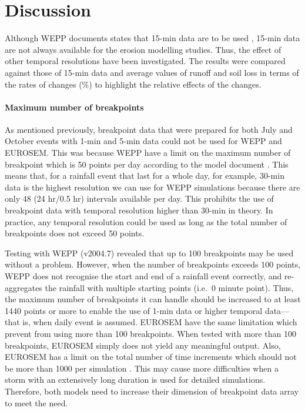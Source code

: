 \section{Discussion}
\label{sec:TemporalScalesDiscussion}

Although WEPP documents states that 15-min data are to be used
\citep{flanagan1995-weppusersummary}, 15-min data are not always available for
the erosion modelling studies. Thus, the effect of other temporal resolutions
have
been investigated. The results were compared against those of 15-min data and
average values of runoff and soil loss in terms of the rates of changes (\%) to
highlight the relative effects of the changes.

\paragraph{Maximum number of breakpoints} As mentioned previously, breakpoint
data that were prepared for both July and October events with 1-min and 5-min
data could not be used for WEPP and EUROSEM. This was because WEPP have a limit
on the maximum number of breakpoint which is 50 points per day according to the
model document \citep[see][page 10]{flanagan1995-weppusersummary}. This means
that, for a rainfall event that last for a whole day, for example, 30-min data
is the highest resolution we can use for WEPP simulations because there are only
48 (24 hr/0.5 hr) intervals available per day. This prohibits the use of
breakpoint data with temporal resolution higher than 30-min in theory. In
practice, any temporal resolution could be used as long as the total number of
breakpoints does not exceed 50 points.

Testing with WEPP (v2004.7) revealed that up to 100 breakpoints may be used
without a problem. However, when the number of breakpoints exceeds 100
points, WEPP does not recognise the start and end of a rainfall event correctly,
and re-aggregates the rainfall with multiple starting points (i.e.\ 0 minute
point). Thus, the maximum number of breakpoints it can handle should be
increased to at least 1440 points or more to enable the use of 1-min data or
higher temporal data---that is, when daily event is assumed. EUROSEM have the
same limitation which prevent from using more than 100 breakpoints. When tested
with more than 100 breakpoints, EUROSEM simply does not yield any meaningful
output. Also, EUROSEM has a limit on the total number of time increments which
should not be more than 1000 per simulation
\citep{morgan1998-europeansoilerosion}. This may cause more difficulties when a
storm with an extensively long duration is used for detailed simulations.
Therefore, both models need to increase their dimension of breakpoint data array
to meet the need.

